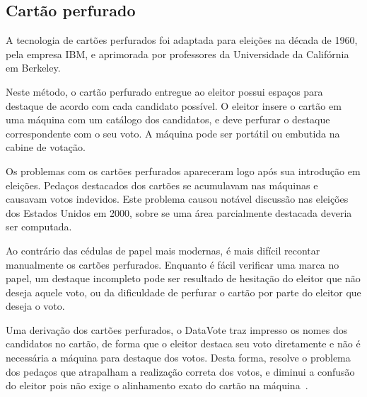 \subsection{Cartão perfurado}

A tecnologia de cartões perfurados foi adaptada para eleições na década de
1960, pela empresa IBM, e aprimorada por professores da Universidade da
Califórnia em Berkeley.

Neste método, o cartão perfurado entregue ao eleitor possui espaços para
destaque de acordo com cada candidato possível. O eleitor insere o cartão em
uma máquina com um catálogo dos candidatos, e deve perfurar o destaque
correspondente com o seu voto. A máquina pode ser portátil ou embutida na
cabine de votação.

Os problemas com os cartões perfurados apareceram logo após sua introdução em
eleições. Pedaços destacados dos cartões se acumulavam nas máquinas e causavam
votos indevidos. Este problema causou notável discussão nas eleições dos
Estados Unidos em 2000, sobre se uma área parcialmente destacada deveria ser
computada.

Ao contrário das cédulas de papel mais modernas, é mais difícil recontar
manualmente os cartões perfurados. Enquanto é fácil verificar uma marca no
papel, um destaque incompleto pode ser resultado de hesitação do eleitor que
não deseja aquele voto, ou da dificuldade de perfurar o cartão por parte do
eleitor que deseja o voto.

Uma derivação dos cartões perfurados, o DataVote traz impresso os nomes dos
candidatos no cartão, de forma que o eleitor destaca seu voto diretamente e não
é necessária a máquina para destaque dos votos. Desta forma, resolve o problema
dos pedaços que atrapalham a realização correta dos votos, e diminui a confusão
do eleitor pois não exige o alinhamento exato do cartão na
máquina~\cite{cranor2003search}.
